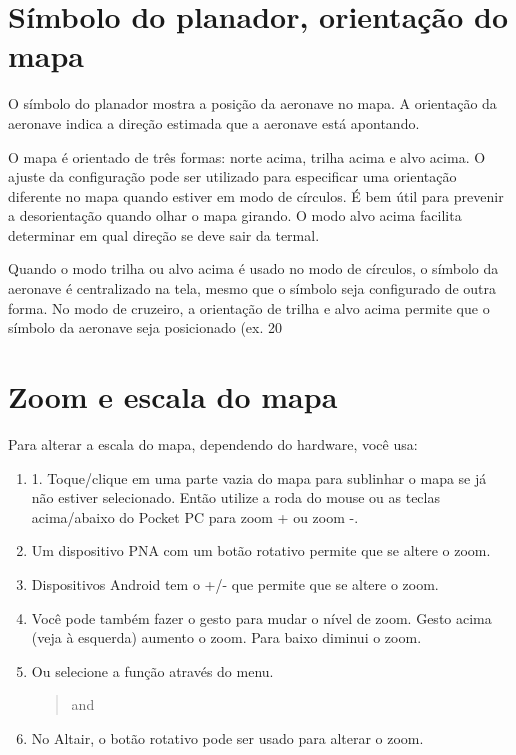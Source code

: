 \section{Símbolo do planador, orientação do mapa}
O símbolo do planador mostra a posição da aeronave no mapa.  A orientação da aeronave indica a direção estimada que a aeronave está apontando.

O mapa é orientado de três formas: norte acima, trilha acima e alvo acima.  O ajuste da configuração pode ser utilizado para especificar uma orientação diferente no mapa quando estiver em modo de círculos.  É bem útil para prevenir a desorientação quando olhar o mapa girando.  O modo alvo acima facilita determinar em qual direção se deve sair da termal.

Quando o modo trilha ou alvo acima é usado no modo de círculos, o símbolo da aeronave é centralizado na tela, mesmo que o símbolo seja configurado de outra forma.  No modo de cruzeiro, a orientação de trilha e alvo acima permite que o símbolo da aeronave seja posicionado (ex. 20%

\section{Zoom e escala do mapa}\label{sec:zooming}

Para alterar a escala do mapa, dependendo do hardware, você usa:
\begin{enumerate}
\item 1.	Toque/clique em uma parte vazia do mapa para sublinhar o mapa se já não estiver selecionado.  Então utilize a roda do mouse ou as teclas acima/abaixo do Pocket PC para zoom + ou zoom -.
\item Um dispositivo PNA com um botão rotativo permite que se altere o zoom.
\item Dispositivos Android tem o +/- que permite que se altere o zoom.
\item Você pode também fazer o gesto para mudar o nível de zoom. Gesto acima (veja à esquerda) aumento o zoom.  Para baixo diminui o zoom.
\item Ou selecione a função através do menu.
\begin{quote}
\blink{} and 
\end{quote}
\item No Altair, o botão rotativo pode ser usado para alterar o zoom.
\end{enumerate}


